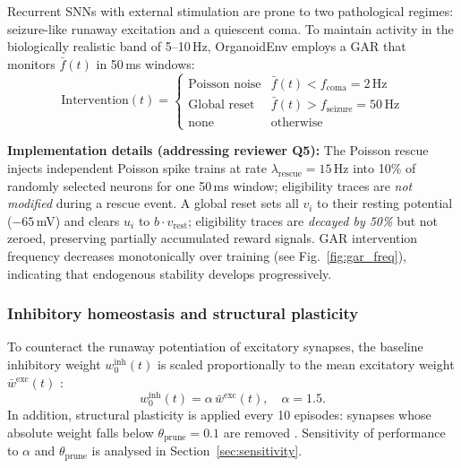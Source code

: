 \documentclass[journal,twocolumn]{IEEEtran}
\begin{document}
Recurrent SNNs with external stimulation are prone to two pathological
regimes: seizure-like runaway excitation and a quiescent coma.  To
maintain activity in the biologically realistic band of 5--10\,Hz,
OrganoidEnv employs a GAR that monitors $\bar{f}(t)$ in 50\,ms
windows:
\begin{equation}
\mathrm{Intervention}(t) =
\begin{cases}
\text{Poisson noise} & \bar{f}(t) < f_{\text{coma}} = 2\,\text{Hz} \\
\text{Global reset}  & \bar{f}(t) > f_{\text{seizure}} = 50\,\text{Hz} \\
\text{none}          & \text{otherwise}
\end{cases}
\label{eq:gar}
\end{equation}

\textbf{Implementation details (addressing reviewer Q5):} The Poisson
rescue injects independent Poisson spike trains at rate
$\lambda_{\mathrm{rescue}} = 15$\,Hz into 10\% of randomly selected
neurons for one 50\,ms window; eligibility traces are \emph{not
modified} during a rescue event.  A global reset sets all $v_i$ to
their resting potential ($-65$\,mV) and clears $u_i$ to
$b \cdot v_{\mathrm{rest}}$; eligibility traces are \emph{decayed by
50\%} but not zeroed, preserving partially accumulated reward signals.
GAR intervention frequency decreases monotonically over training (see
Fig.~\ref{fig:gar_freq}), indicating that endogenous stability
develops progressively.

\subsubsection{Inhibitory homeostasis and structural plasticity}

To counteract the runaway potentiation of excitatory synapses, the
baseline inhibitory weight $w_0^{\mathrm{inh}}(t)$ is scaled
proportionally to the mean excitatory weight
$\bar{w}^{\mathrm{exc}}(t)$
\cite{HomeostaticSTDP2010,Turrigiano2008SelfTuning}:
\begin{equation}
w_0^{\mathrm{inh}}(t) = \alpha\,\bar{w}^{\mathrm{exc}}(t),
\quad \alpha = 1.5.
\label{eq:inh}
\end{equation}
In addition, structural plasticity is applied every 10 episodes:
synapses whose absolute weight falls below $\theta_{\mathrm{prune}}
= 0.1$ are removed \cite{eLifeHomeostatic2025}.  Sensitivity of
performance to $\alpha$ and $\theta_{\mathrm{prune}}$ is analysed in
Section~\ref{sec:sensitivity}.
\end{document}
